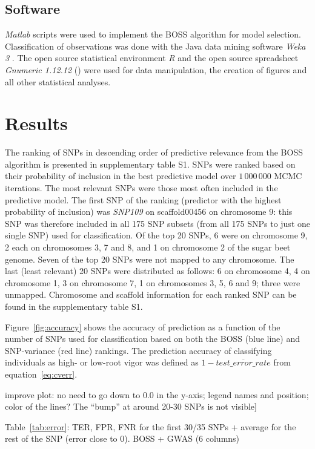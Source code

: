 \subsection{Software}
\label{sec:software}
\emph{Matlab} scripts \cite{MATLAB2010} were used to implement the BOSS
algorithm for model selection. Classification of observations was done
with the Java data mining software \emph{Weka 3} \cite{hall2009weka}.
The open source statistical environment \emph{R} \cite{r2008manual} and
the open source spreadsheet \emph{Gnumeric 1.12.12}
(\cite{gnumeric2014}) were used for data manipulation, the creation of
figures and all other statistical analyses.

\section{Results}
\label{sec:results}
The ranking of SNPs in descending order of predictive relevance from the
BOSS algorithm is presented in supplementary table S1. SNPs were ranked
based on their probability of inclusion in the best predictive model over
$1\,000\,000$ MCMC iterations. The most relevant SNPs were those most often
included in the predictive model. The first SNP of the ranking (predictor with the highest probability of
inclusion) was \emph{SNP109} on scaffold00456 on chromosome 9: this SNP was therefore
included in all 175 SNP subsets (from all 175 SNPs to just one single
SNP) used for classification. Of the top 20 SNPs, 6 were on chromosome
9, 2 each on chromosomes 3, 7 and 8, and 1 on chromosome 2 of the sugar
beet genome. Seven of the top 20 SNPs were not mapped to any chromosome. 
The last (least relevant) 20 SNPs were distributed as follows: 6 on chromosome 4, 4 on
chromosome 1, 3 on chromosome 7, 1 on chromosomes 3, 5, 6 and 9; three
were unmapped. Chromosome and scaffold information for each ranked SNP
can be found in the supplementary table S1.
  
Figure~\ref{fig:accuracy} shows the accuracy of prediction as a function of the number of
SNPs used for classification based on both the BOSS (blue line) and
SNP-variance (red line) rankings. The prediction accuracy of classifying
individuals as high- or low-root vigor was defined as $1 -
\overline{test\_error\_rate}$ from equation~\ref{eq:cverr}.


improve plot: no need to go down to 0.0 in
the y-axis; legend names and position; color of the lines? The ``bump''
at around 20-30 SNPs is not visible]

Table~\ref{tab:error}: TER, FPR, FNR for the first 30/35 SNPs + average for the
rest of the SNP (error close to $0$). BOSS + GWAS (6 columns)


